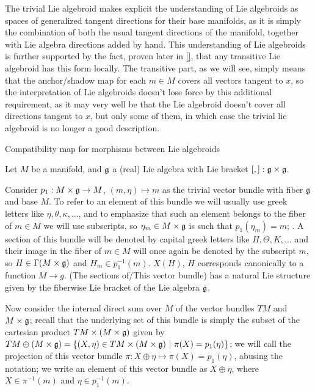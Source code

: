 The trivial Lie algebroid makes explicit the understanding of Lie algebroids as spaces of generalized tangent directions for their base manifolds, as it is simply the combination of both the usual tangent directions of the manifold, together with Lie algebra directions added by hand. This understanding of Lie algebroids is further supported by the fact, proven later in \ref{}, that any transitive Lie algebroid has this form locally. The transitive part, as we will see, simply means that the anchor/shadow map for each $m \in M$ covers all vectors tangent to $x$, so the interpretation of Lie algebroids doesn't lose force by this additional requirement, as it may very well be that the Lie algebroid doesn't cover all directions tangent to $x$, but only some of them, in which case the trivial lie algebroid is no longer a good description.

Compatibility map for morphisms between Lie algebroids

Let $M$ be a manifold, and $\mathfrak{g}$ a (real) Lie algebra with Lie bracket $[,]: \mathfrak{g} \times \mathfrak{g}$. 

Consider $p_1: M \times \mathfrak{g} \to M$, $(m, \eta) \mapsto m$ as the trivial vector bundle with fiber $\mathfrak{g}$ and base $M$. To refer to an element of this bundle we will usually use greek letters like $\eta, \theta, \kappa, \dots$, and to emphasize that such an element belongs to the fiber of $m \in M$ we will use subscripts, so $\eta_m \in M \times \mathfrak{g}$ is such that $p_1(\eta_m) = m$; . A section of this bundle will be denoted by capital greek letters like $H, \Theta, K, \dots$ and their image in the fiber of $m \in M$ will once again be denoted by the subscript $m$, so $H \in \Gamma(M \times \mathfrak{g})$ and $H_m \in p_1^{-1}(m)$. $X(H)$, $H$ corresponds canonically to a function $M \to g$. (The sections of/This vector bundle) has a natural Lie structure given by the fiberwise Lie bracket of the Lie algebra $\mathfrak{g}$.

Now consider the internal direct sum over $M$ of the vector bundles $TM$ and $M \times \mathfrak{g}$; recall  that the underlying set of this bundle is simply the subset of the cartesian product $TM \times (M \times \mathfrak{g})$ given by $TM \oplus (M \times \mathfrak{g}) = \{(X, \eta) \in TM \times (M \times \mathfrak{g}) \operatorname{\,|\,} \pi(X) = p_1(\eta)\}$; we will call the projection of this vector bundle $\pi: X \oplus \eta \mapsto \pi(X) = p_1(\eta)$, abusing the notation; we write an element of this vector bundle as $X \oplus \eta$, where $X \in \pi^{-1}(m)$ and $\eta \in p_1^{-1}(m)$.

